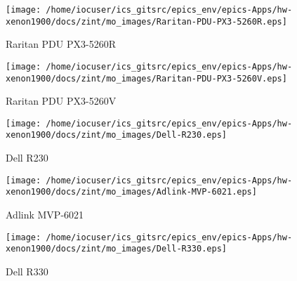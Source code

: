\noindent
\vspace{1.4cm}
\begin{minipage}{.2\textwidth}
\begin{center}
\texttt{[image: /home/iocuser/ics\_gitsrc/epics\_env/epics-Apps/hw-xenon1900/docs/zint/mo\_images/Raritan-PDU-PX3-5260R.eps]}
\end{center}
\end{minipage}
\begin{minipage}{.7\textwidth}
Raritan PDU PX3-5260R
\end{minipage}


\noindent
\vspace{1.4cm}
\begin{minipage}{.2\textwidth}
\begin{center}
\texttt{[image: /home/iocuser/ics\_gitsrc/epics\_env/epics-Apps/hw-xenon1900/docs/zint/mo\_images/Raritan-PDU-PX3-5260V.eps]}
\end{center}
\end{minipage}
\begin{minipage}{.7\textwidth}
Raritan PDU PX3-5260V
\end{minipage}


\noindent
\vspace{1.4cm}
\begin{minipage}{.2\textwidth}
\begin{center}
\texttt{[image: /home/iocuser/ics\_gitsrc/epics\_env/epics-Apps/hw-xenon1900/docs/zint/mo\_images/Dell-R230.eps]}
\end{center}
\end{minipage}
\begin{minipage}{.7\textwidth}
Dell R230
\end{minipage}


\noindent
\vspace{1.4cm}
\begin{minipage}{.2\textwidth}
\begin{center}
\texttt{[image: /home/iocuser/ics\_gitsrc/epics\_env/epics-Apps/hw-xenon1900/docs/zint/mo\_images/Adlink-MVP-6021.eps]}
\end{center}
\end{minipage}
\begin{minipage}{.7\textwidth}
Adlink MVP-6021
\end{minipage}


\noindent
\vspace{1.4cm}
\begin{minipage}{.2\textwidth}
\begin{center}
\texttt{[image: /home/iocuser/ics\_gitsrc/epics\_env/epics-Apps/hw-xenon1900/docs/zint/mo\_images/Dell-R330.eps]}
\end{center}
\end{minipage}
\begin{minipage}{.7\textwidth}
Dell R330
\end{minipage}



